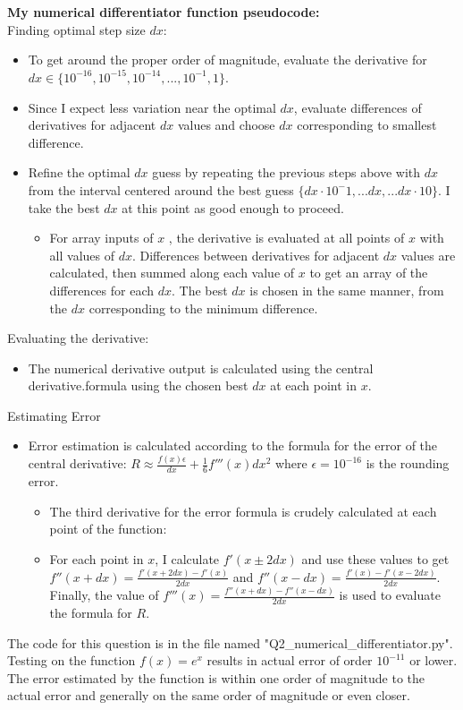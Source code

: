 \documentclass{article}
\newcommand{\<}[1]{\left\langle #1 \right\rangle }
\begin{document}
\section{}
\textbf{My numerical differentiator function pseudocode:}\\
Finding optimal step size $dx$:
\begin{itemize}
	\item To get around the proper order of magnitude, evaluate the derivative for $dx \in \{10^{-16}, 10^{-15}, 10^{-14}, ..., 10^{-1}, 1 \}$.
	\item Since I expect less variation near the optimal $dx$, evaluate differences of derivatives for adjacent $dx$ values and choose $dx$ corresponding to smallest difference.
	\item Refine the optimal $dx$ guess by repeating the previous steps above with $dx$ from the interval centered around the best guess $\{dx\cdot10^-1, ... dx, ... dx\cdot10\}$. I take the best $dx$ at this point as good enough to proceed.
	\begin{itemize}
		\item For array inputs of $x$ , the derivative is evaluated at all points of $x$ with all values of $dx$. Differences between derivatives for adjacent $dx$ values are calculated, then summed along each value of $x$ to get an array of the differences for each $dx$. The best $dx$ is chosen in the same manner, from the  $dx$ corresponding to the minimum difference.
	\end{itemize}
\end{itemize}
Evaluating the derivative:
\begin{itemize}
	\item The numerical derivative output is calculated using the central derivative.formula using the chosen best $dx$ at each point in $x$.
\end{itemize}
Estimating Error
\begin{itemize}
	\item Error estimation is calculated according to the formula for the error of the central derivative: $R \approx \frac{f(x)\epsilon}{dx} + \frac{1}{6}f'''(x)dx^2$ where $\epsilon = 10^{-16}$ is the rounding error.
	\begin{itemize}
		\item The third derivative for the error formula is crudely calculated at each point of the function:
		\item For each point in $x$, I calculate $f'(x\pm2dx)$ and use these values to get $f''(x+dx) = \frac{f'(x+2dx) - f'(x)}{2dx}$ and $f''(x-dx) = \frac{f'(x) - f'(x-2dx)}{2dx}$. Finally, the value of $f'''(x) = \frac{f''(x+dx) - f''(x-dx)}{2dx}$ is used to evaluate the formula for $R$.
	\end{itemize}
\end{itemize}
The code for this question is in the file named "Q2\_numerical\_differentiator.py". Testing on the function $f(x) = e^x$ results in actual error of order $10^{-11}$ or lower. The error estimated by the function is within one order of magnitude to the actual error and generally on the same order of magnitude or even closer.
\end{document}
